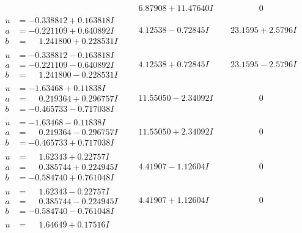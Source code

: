 \documentclass[1p]{elsarticle_modified}
\theoremstyle{definition}
\begin{document}
$$\begin{array}{c|c|c}
 & \phantom{-}6.87908 + 11.47640 I & \phantom{-0.000000 } 0 \\ \hline\begin{aligned}
u &= -0.338812 + 0.163818 I \\
a &= -0.221109 + 0.640892 I \\
b &= \phantom{-}1.241800 + 0.228531 I\end{aligned}
 & \phantom{-}4.12538 - 0.72845 I & \phantom{-}23.1595 + 2.5796 I \\ \hline\begin{aligned}
u &= -0.338812 - 0.163818 I \\
a &= -0.221109 - 0.640892 I \\
b &= \phantom{-}1.241800 - 0.228531 I\end{aligned}
 & \phantom{-}4.12538 + 0.72845 I & \phantom{-}23.1595 - 2.5796 I \\ \hline\begin{aligned}
u &= -1.63468 + 0.11838 I \\
a &= \phantom{-}0.219364 + 0.296757 I \\
b &= -0.465733 - 0.717038 I\end{aligned}
 & \phantom{-}11.55050 - 2.34092 I & \phantom{-0.000000 } 0 \\ \hline\begin{aligned}
u &= -1.63468 - 0.11838 I \\
a &= \phantom{-}0.219364 - 0.296757 I \\
b &= -0.465733 + 0.717038 I\end{aligned}
 & \phantom{-}11.55050 + 2.34092 I & \phantom{-0.000000 } 0 \\ \hline\begin{aligned}
u &= \phantom{-}1.62343 + 0.22757 I \\
a &= \phantom{-}0.385744 + 0.224945 I \\
b &= -0.584740 + 0.761048 I\end{aligned}
 & \phantom{-}4.41907 - 1.12604 I & \phantom{-0.000000 } 0 \\ \hline\begin{aligned}
u &= \phantom{-}1.62343 - 0.22757 I \\
a &= \phantom{-}0.385744 - 0.224945 I \\
b &= -0.584740 - 0.761048 I\end{aligned}
 & \phantom{-}4.41907 + 1.12604 I & \phantom{-0.000000 } 0 \\ \hline\begin{aligned}
u &= \phantom{-}1.64649 + 0.17516 I \\

\end{aligned}
\end{array}$$
\end{document}
